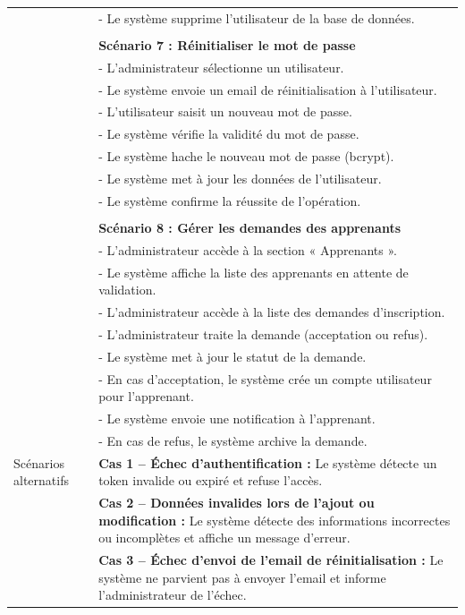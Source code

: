 {\begin{longtable}{|l|p{12cm}|}
&- Le système supprime l'utilisateur de la base de données. \\
\\
& \textbf{Scénario 7 : Réinitialiser le mot de passe} \\
&- L'administrateur sélectionne un utilisateur. \\
&- Le système envoie un email de réinitialisation à l'utilisateur. \\
&- L'utilisateur saisit un nouveau mot de passe. \\
&- Le système vérifie la validité du mot de passe. \\
&- Le système hache le nouveau mot de passe (bcrypt). \\
&- Le système met à jour les données de l'utilisateur. \\
&- Le système confirme la réussite de l'opération. \\
\\
& \textbf{Scénario 8 : Gérer les demandes des apprenants} \\
&- L'administrateur accède à la section « Apprenants ». \\
&- Le système affiche la liste des apprenants en attente de validation. \\
&- L'administrateur accède à la liste des demandes d'inscription. \\
&- L'administrateur traite la demande (acceptation ou refus). \\
&- Le système met à jour le statut de la demande. \\
&- En cas d'acceptation, le système crée un compte utilisateur pour l'apprenant. \\
&- Le système envoie une notification à l'apprenant. \\
&- En cas de refus, le système archive la demande. \\
\hline

Scénarios alternatifs &
\textbf{Cas 1 -- Échec d'authentification :} Le système détecte un token invalide ou expiré et refuse l'accès. \\
& \textbf{Cas 2 -- Données invalides lors de l'ajout ou modification :} Le système détecte des informations incorrectes ou incomplètes et affiche un message d'erreur. \\
& \textbf{Cas 3 -- Échec d'envoi de l'email de réinitialisation :} Le système ne parvient pas à envoyer l'email et informe l'administrateur de l'échec. \\
\hline


\end{longtable}}
